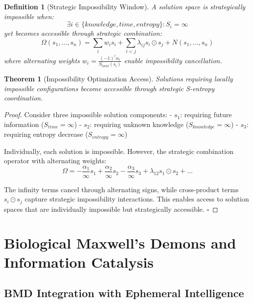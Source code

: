 \documentclass[12pt,a4paper]{article}
\newtheorem{theorem}{Theorem}
\newtheorem{definition}{Definition}
\begin{document}
\begin{definition}[Strategic Impossibility Window]
A solution space is strategically impossible when:
\begin{equation}
\exists i \in \{knowledge, time, entropy\} : S_i = \infty
\end{equation}
yet becomes accessible through strategic combination:
\begin{equation}
\Omega(s_1, \ldots, s_n) = \sum_i w_i s_i + \sum_{i<j} \lambda_{ij} s_i \odot s_j + N(s_1, \ldots, s_n)
\end{equation}
where alternating weights $w_i = \frac{(-1)^i \alpha_i}{S_{local}(s_i)}$ enable impossibility cancellation.
\end{definition}

\begin{theorem}[Impossibility Optimization Access]
Solutions requiring locally impossible configurations become accessible through strategic S-entropy coordination.
\end{theorem}

\begin{proof}
Consider three impossible solution components:
- $s_1$: requiring future information ($S_{time} = \infty$)
- $s_2$: requiring unknown knowledge ($S_{knowledge} = \infty$) 
- $s_3$: requiring entropy decrease ($S_{entropy} = \infty$)

Individually, each solution is impossible. However, the strategic combination operator with alternating weights:
\begin{equation}
\Omega = -\frac{\alpha_1}{\infty}s_1 + \frac{\alpha_2}{\infty}s_2 - \frac{\alpha_3}{\infty}s_3 + \lambda_{12}s_1\odot s_2 + \ldots
\end{equation}

The infinity terms cancel through alternating signs, while cross-product terms $s_i \odot s_j$ capture strategic impossibility interactions. This enables access to solution spaces that are individually impossible but strategically accessible. $\square$
\end{proof}

\section{Biological Maxwell's Demons and Information Catalysis}

\subsection{BMD Integration with Ephemeral Intelligence}
\end{document}
